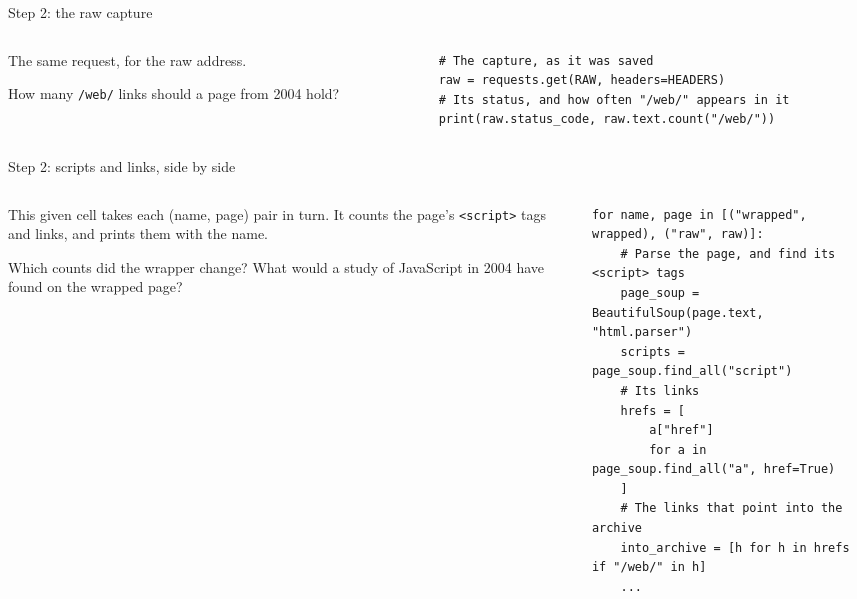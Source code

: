 \documentclass[9pt,aspectratio=169]{beamer}
\begin{document}
\begin{frame}[fragile]{Step 2: the raw capture}
    \begin{columns}[T]
        \begin{column}{0.37\textwidth}
            The same request, for the raw address.

            \medskip
            How many \texttt{/web/} links should a page from 2004 hold?
        \end{column}
        \begin{column}{0.6\textwidth}
\begin{lstlisting}
# The capture, as it was saved
raw = requests.get(RAW, headers=HEADERS)
# Its status, and how often "/web/" appears in it
print(raw.status_code, raw.text.count("/web/"))
\end{lstlisting}
        \end{column}
    \end{columns}
\end{frame}

\begin{frame}[fragile]{Step 2: scripts and links, side by side}
    \begin{columns}[T]
        \begin{column}{0.37\textwidth}
            This given cell takes each (name, page) pair in turn. It counts the page's \texttt{<script>} tags and links, and prints them with the name.

            \medskip
            Which counts did the wrapper change? What would a study of JavaScript in 2004 have found on the wrapped page?
        \end{column}
        \begin{column}{0.6\textwidth}
\begin{lstlisting}
for name, page in [("wrapped", wrapped), ("raw", raw)]:
    # Parse the page, and find its <script> tags
    page_soup = BeautifulSoup(page.text, "html.parser")
    scripts = page_soup.find_all("script")
    # Its links
    hrefs = [
        a["href"]
        for a in page_soup.find_all("a", href=True)
    ]
    # The links that point into the archive
    into_archive = [h for h in hrefs if "/web/" in h]
    ...
\end{lstlisting}
        \end{column}
    \end{columns}
\end{frame}
\end{document}
